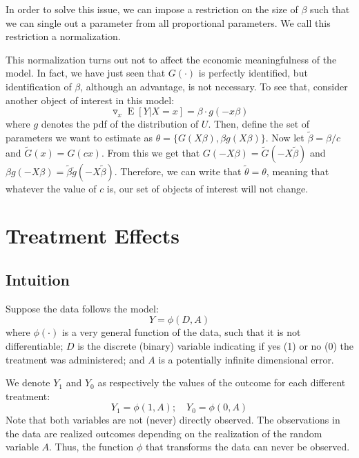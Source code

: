 \documentclass[12pt]{report}
\newcommand{\E}[1]{\operatorname{E}\left[#1\right]}
\begin{document}
In order to solve this issue, we can impose a restriction on the size of $\beta$ such that we can single out a parameter from all proportional parameters. We call this restriction a normalization. 

This normalization turns out not to affect the economic meaningfulness of the model. In fact, we have just seen that $G(\cdot)$ is perfectly identified, but identification of $\beta$, although an advantage, is not necessary. To see that, consider another object of interest in this model:
$$\triangledown_x \E{Y\vert X = x} = \beta \cdot  g(-x\beta) $$ where $g$ denotes the pdf of the distribution of $U$. Then, define the set of parameters we want to estimate as $\theta = \{G(X\beta), \beta g(X\beta)\}$. Now let $\tilde{\beta} = \beta/c$ and $\tilde{G}(x) = G(cx)$. From this we get that $G(-X\beta) = \tilde{G}(-X\tilde\beta)$ and $\beta g(-X\beta) = \tilde\beta\tilde g(-X\tilde\beta)$. Therefore, we can write that $\tilde\theta = \theta$, meaning that whatever the value of $c$ is, our set of objects of interest will not change.

\chapter{Treatment Effects}

\section{Intuition}

Suppose the data follows the model: $$ Y = \phi(D, A) $$ where $\phi(\cdot)$ is a very general function of the data, such that it is not differentiable; $D$ is the discrete (binary) variable indicating if yes (1) or no (0) the treatment was administered; and $A$ is a potentially infinite dimensional error.

We denote $Y_1$ and $Y_0$ as respectively the values of the outcome for each different treatment: $$Y_1 = \phi(1, A) ; \quad Y_0 = \phi(0, A) $$ Note that both variables are not (never) directly observed. The observations in the data are realized outcomes depending on the realization of the random variable $A$. Thus, the function $\phi$ that transforms the data can never be observed.
\end{document}
